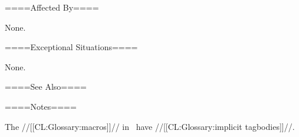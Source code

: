 ====Affected By====

None.

====Exceptional Situations====

None.

====See Also====


====Notes====

The //[[CL:Glossary:macros]]// in \thenextfigure\ have //[[CL:Glossary:implicit tagbodies]]//.


